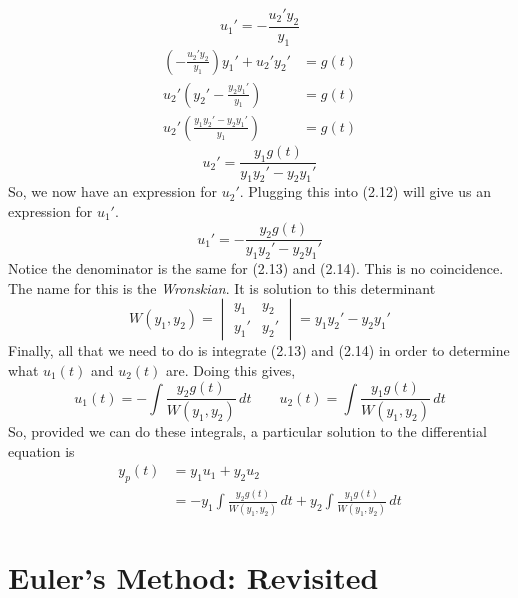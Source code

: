 \documentclass[10pt,reqno]{book}
\theoremstyle{definition}
\begin{document}
	\begin{equation}
		u_1' = -\frac{u_2' y_2}{y_1}
	\end{equation}
	\begin{align*}
		\left( -\frac{u_2' y_2}{y_1} \right)y_1' + u_2 ' y_2' &= g(t)\\
		u_2' \left( y_2' - \frac{y_2 y_1'}{y_1} \right) &= g(t)\\
		u_2' \left( \frac{y_1 y_2' - y_2 y_1'}{y_1} \right) &= g(t)
	\end{align*}
	\begin{equation}
		u_2 ' = \frac{y_1 g(t)}{y_1 y_2' - y_2 y_1'}
	\end{equation}
	So, we now have an expression for $ u_2' $. Plugging this into (2.12) will give us an expression for $ u_1' $.
	\begin{equation}
		u_1' = -\frac{y_2 g(t)}{y_1 y_2' - y_2 y_1'}
	\end{equation}
	Notice the denominator is the same for (2.13) and (2.14). This is no coincidence. The name for this is the \textit{Wronskian}. It is solution to this determinant
	\[ W(y_1,y_2) =
	\begin{vmatrix}
		y_1 & y_2\\
		y_1' & y_2'
	\end{vmatrix}
	= y_1 y_2' - y_2 y_1' \]
	Finally, all that we need to do is integrate (2.13) and (2.14) in order to determine what $ u_1(t) $ and $ u_2(t) $ are. Doing this gives,
	\[ u_1(t) = -\int \frac{y_2 g(t)}{W(y_1,y_2)}\,dt \qquad u_2(t) = \int \frac{y_1 g(t)}{W(y_1,y_2)}\,dt  \]
	So, provided we can do these integrals, a particular solution to the differential equation is
	\begin{align*}
		y_p(t) &= y_1 u_1 + y_2 u_2\\
		&= -y_1 \int \frac{y_2 g(t)}{W(y_1,y_2)}\,dt + y_2 \int \frac{y_1 g(t)}{W(y_1,y_2)}\,dt
	\end{align*}
	
	\section{Euler's Method: Revisited}
	
\end{document}
